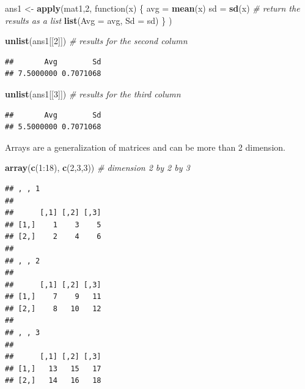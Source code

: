 \documentclass[]{book}
\newenvironment{Shaded}{\begin{snugshade}}{\end{snugshade}}
\newcommand{\KeywordTok}[1]{\textcolor[rgb]{0.13,0.29,0.53}{\textbf{{#1}}}}
\newcommand{\DataTypeTok}[1]{\textcolor[rgb]{0.13,0.29,0.53}{{#1}}}
\newcommand{\DecValTok}[1]{\textcolor[rgb]{0.00,0.00,0.81}{{#1}}}
\newcommand{\StringTok}[1]{\textcolor[rgb]{0.31,0.60,0.02}{{#1}}}
\newcommand{\CommentTok}[1]{\textcolor[rgb]{0.56,0.35,0.01}{\textit{{#1}}}}
\newcommand{\NormalTok}[1]{{#1}}
\theoremstyle{definition}
\theoremstyle{definition}
\theoremstyle{remark}
\begin{document}
\begin{Shaded}
\begin{Highlighting}[]
\NormalTok{ans1 <-}\StringTok{ }\KeywordTok{apply}\NormalTok{(mat1,}\DecValTok{2}\NormalTok{, function(x) \{   }
                         \NormalTok{avg =}\StringTok{ }\KeywordTok{mean}\NormalTok{(x)}
                         \NormalTok{sd =}\StringTok{ }\KeywordTok{sd}\NormalTok{(x)}
                          \CommentTok{# return the results as a list}
                         \KeywordTok{list}\NormalTok{(}\DataTypeTok{Avg =} \NormalTok{avg, }\DataTypeTok{Sd =} \NormalTok{sd)}
                      \NormalTok{\}}
        \NormalTok{)}

\KeywordTok{unlist}\NormalTok{(ans1[[}\DecValTok{2}\NormalTok{]])  }\CommentTok{# results for the second column  }
\end{Highlighting}
\end{Shaded}

\begin{verbatim}
##       Avg        Sd 
## 7.5000000 0.7071068
\end{verbatim}

\begin{Shaded}
\begin{Highlighting}[]
\KeywordTok{unlist}\NormalTok{(ans1[[}\DecValTok{3}\NormalTok{]])  }\CommentTok{# results for the third column  }
\end{Highlighting}
\end{Shaded}

\begin{verbatim}
##       Avg        Sd 
## 5.5000000 0.7071068
\end{verbatim}

Arrays are a generalization of matrices and can be more than 2
dimension.

\begin{Shaded}
\begin{Highlighting}[]
\KeywordTok{array}\NormalTok{(}\KeywordTok{c}\NormalTok{(}\DecValTok{1}\NormalTok{:}\DecValTok{18}\NormalTok{), }\KeywordTok{c}\NormalTok{(}\DecValTok{2}\NormalTok{,}\DecValTok{3}\NormalTok{,}\DecValTok{3}\NormalTok{))  }\CommentTok{# dimension 2 by 2 by 3}
\end{Highlighting}
\end{Shaded}

\begin{verbatim}
## , , 1
## 
##      [,1] [,2] [,3]
## [1,]    1    3    5
## [2,]    2    4    6
## 
## , , 2
## 
##      [,1] [,2] [,3]
## [1,]    7    9   11
## [2,]    8   10   12
## 
## , , 3
## 
##      [,1] [,2] [,3]
## [1,]   13   15   17
## [2,]   14   16   18
\end{verbatim}
\end{document}
